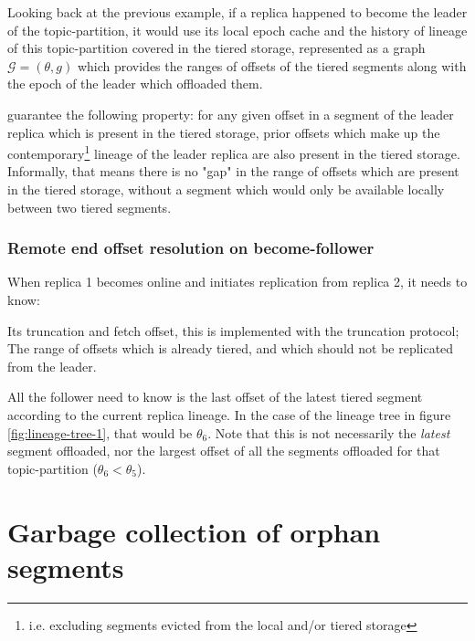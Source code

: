 \documentclass{article}
\begin{document}
Looking back at the previous example, if a replica happened to become the leader of the topic-partition, it would use its local epoch cache and the history of lineage of this topic-partition covered in the tiered storage, represented as a graph $\mathcal{G}=(\theta,g)$ which provides the ranges of offsets of the tiered segments along with the epoch of the leader which offloaded them.

guarantee the following property: for any given offset in a segment of the leader replica which is present in the tiered storage, prior offsets which make up the contemporary\footnote{i.e. excluding segments evicted from the local and/or tiered storage} lineage of the leader replica are also present in the tiered storage. Informally, that means there is no "gap" in the range of offsets which are present in the tiered storage, without a segment which would only be available locally between two tiered segments.

\subsubsection{Remote end offset resolution on become-follower}

When replica 1 becomes online and initiates replication from replica 2, it needs to know:

\begin{outline}[enumerate]
\1 Its truncation and fetch offset, this is implemented with the truncation protocol;
\1 The range of offsets which is already tiered, and which should not be replicated from the leader.
\end{outline}


All the follower need to know is the last offset of the latest tiered segment according to the current replica lineage. In the case of the lineage tree in figure \ref{fig:lineage-tree-1}, that would be $\theta_6$. Note that this is not necessarily the \textit{latest} segment offloaded, nor the largest offset of all the segments offloaded for that topic-partition ($\theta_6 < \theta_5$).


\section{Garbage collection of orphan segments}

\newpage

{}
\end{document}
